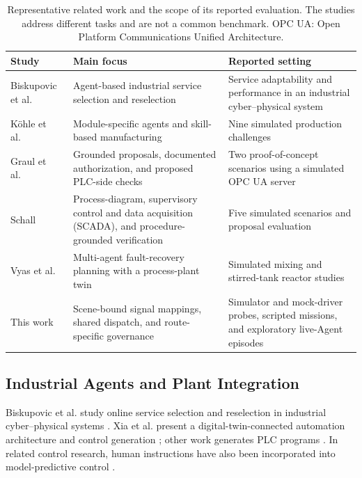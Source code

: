 \documentclass[journal]{IEEEtran}
\begin{document}
\begin{table}[!t]
\centering
\caption{Representative related work and the scope of its reported evaluation. The studies address different tasks and are not a common benchmark. OPC UA: Open Platform Communications Unified Architecture.}
\label{tab:related-comparison}
\footnotesize
\setlength{\tabcolsep}{5pt}
\begin{tabularx}{\textwidth}{@{}>{\raggedright\arraybackslash}p{}>{\raggedright\arraybackslash}p{}X@{}}
\toprule
Study & Main focus & Reported setting \\
\midrule
Biskupovic et al.~\cite{biskupovic2025supervision} & Agent-based industrial service selection and reselection & Service adaptability and performance in an industrial cyber--physical system \\
K\"{o}hle et al.~\cite{koehle2026llmdriven} & Module-specific agents and skill-based manufacturing & Nine simulated production challenges \\
Graul et al.~\cite{graul2026aas} & Grounded proposals, documented authorization, and proposed PLC-side checks & Two proof-of-concept scenarios using a simulated OPC UA server \\
Schall~\cite{schall2026safe} & Process-diagram, supervisory control and data acquisition (SCADA), and procedure-grounded verification & Five simulated scenarios and proposal evaluation \\
Vyas et al.~\cite{vyas2026detection} & Multi-agent fault-recovery planning with a process-plant twin & Simulated mixing and stirred-tank reactor studies \\
This work & Scene-bound signal mappings, shared dispatch, and route-specific governance & Simulator and mock-driver probes, scripted missions, and exploratory live-Agent episodes \\
\bottomrule
\end{tabularx}
\end{table}

\subsection{Industrial Agents and Plant Integration}
Biskupovic et al. study online service selection and reselection in industrial cyber--physical systems \cite{biskupovic2025supervision}. Xia et al. present a digital-twin-connected automation architecture and control generation \cite{xia2025architecture,xia2025control}; other work generates PLC programs \cite{liu2026agents4plc}. In related control research, human instructions have also been incorporated into model-predictive control \cite{wu2025instructmpc}.
\end{document}
